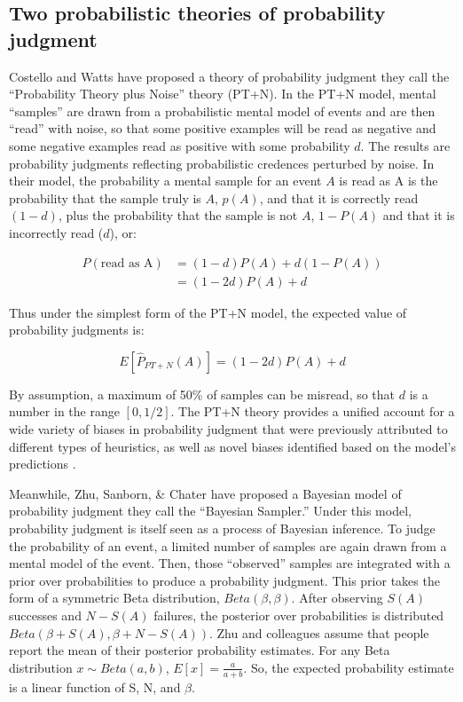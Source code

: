 \documentclass[
  english,
  man,floatsintext]{apa6}
\begin{document}
\hypertarget{two-probabilistic-theories-of-probability-judgment}{%
\subsection{Two probabilistic theories of probability judgment}\label{two-probabilistic-theories-of-probability-judgment}}

Costello and Watts \autocite*{costello.watts2014,costello.watts2016,costello.watts2018} have proposed a theory of probability judgment they call the ``Probability Theory plus Noise'' theory (PT+N). In the PT+N model, mental ``samples'' are drawn from a probabilistic mental model of events and are then ``read'' with noise, so that some positive examples will be read as negative and some negative examples read as positive with some probability \(d\). The results are probability judgments reflecting probabilistic credences perturbed by noise. In their model, the probability a mental sample for an event \(A\) is read as A is the probability that the sample truly is \(A\), \(p(A)\), and that it is correctly read \((1-d)\), plus the probability that the sample is not \(A\), \(1-P(A)\) and that it is incorrectly read (\(d\)), or:

\begin{align*}
  P(\text{read as A}) &= (1-d)P(A) + d(1-P(A)) \\
  &= (1-2d)P(A) + d
\end{align*}

Thus under the simplest form of the PT+N model, the expected value of probability judgments is:

\[E[\hat{P}_{PT+N}(A)] = (1-2d)P(A) + d \]

By assumption, a maximum of 50\% of samples can be misread, so that \(d\) is a number in the range \([0, 1/2]\). The PT+N theory provides a unified account for a wide variety of biases in probability judgment that were previously attributed to different types of heuristics, as well as novel biases identified based on the model's predictions \autocite{costello.watts2014,costello.watts2016,costello.watts2017,costello.watts2018}.

Meanwhile, Zhu, Sanborn, \& Chater \autocite*{zhu.etal2020} have proposed a Bayesian model of probability judgment they call the ``Bayesian Sampler.'' Under this model, probability judgment is itself seen as a process of Bayesian inference. To judge the probability of an event, a limited number of samples are again drawn from a mental model of the event. Then, those ``observed'' samples are integrated with a prior over probabilities to produce a probability judgment. This prior takes the form of a symmetric Beta distribution, \(Beta(\beta, \beta)\). After observing \(S(A)\) successes and \(N - S(A)\) failures, the posterior over probabilities is distributed \(Beta(\beta + S(A), \beta + N - S(A))\). Zhu and colleagues \autocite*{zhu.etal2020} assume that people report the mean of their posterior probability estimates. For any Beta distribution \(x \sim Beta(a,b)\), \(E[x] = \frac{a}{a+b}\). So, the expected probability estimate is a linear function of S, N, and \(\beta\).
\end{document}

